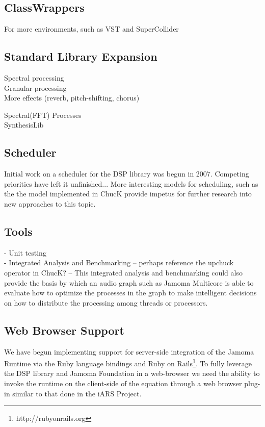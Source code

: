 \documentclass[twoside,10pt]{article}
\begin{document}
\subsection{ClassWrappers}

For more environments, such as VST and SuperCollider

\subsection{Standard Library Expansion}

Spectral processing \\

Granular processing   \\

More effects (reverb, pitch-shifting, chorus) 


Spectral(FFT) Processes\\

SynthesisLib

\subsection{Scheduler}

Initial work on a scheduler for the DSP library was begun in 2007.  Competing priorities have left it unfinished...  More interesting models for scheduling, such as the the model implemented in ChucK provide impetus for further research into new approaches to this topic.

\subsection{Tools}

- Unit testing      \\

- Integrated Analysis and Benchmarking -- perhaps reference the upchuck operator in ChucK?
   -- This integrated analysis and benchmarking could also provide the basis by which an audio graph such as Jamoma Multicore is able to evaluate how to optimize the processes in the graph to make intelligent decisions on how to distribute the processing among threads or processors.


\subsection{Web Browser Support}
We have begun implementing support for server-side integration of the Jamoma Runtime via the Ruby language bindings and Ruby on Rails\footnote{http://rubyonrails.org}.  To fully leverage the DSP library and Jamoma Foundation in a web-browser we need the ability to invoke the runtime on the client-side of the equation through a web browser plug-in similar to that done in the iARS Project\cite{Frauenberger:2003}.
\end{document}

